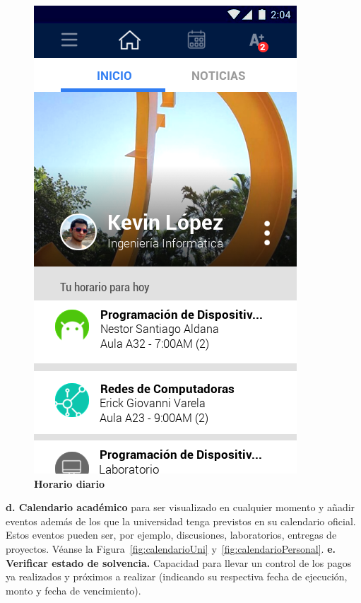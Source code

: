 \documentclass[12pt]{article}
\begin{document}
\begin{figure}[H]
	\caption{\textbf{Horario diario}}
	\label{fig:horarioDiario}
	\includegraphics[scale=0.50]{img/2.png}
	\centering
\end{figure}

\setlength{\parindent}{0cm}
\textbf{d. Calendario académico} para ser visualizado en cualquier momento y añadir eventos además de los que la universidad tenga previstos en su calendario oficial. Estos eventos pueden ser, por ejemplo, discusiones, laboratorios, entregas de proyectos. Véanse la Figura~\ref{fig:calendarioUni} y~\ref{fig:calendarioPersonal}.
\newline
\newline
\textbf{e. Verificar estado de solvencia. } Capacidad para llevar un control de los pagos ya realizados y pr\'oximos a realizar (indicando su respectiva fecha de ejecuci\'on, monto y fecha de vencimiento). 
\end{document}
